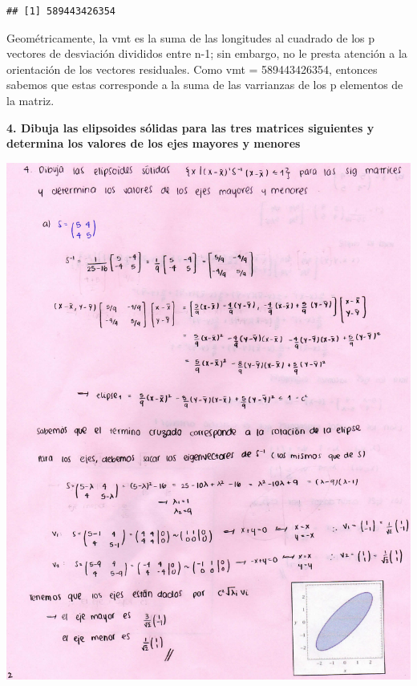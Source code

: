 \documentclass[
]{article}
\begin{document}
\begin{verbatim}
## [1] 589443426354
\end{verbatim}

Geométricamente, la vmt es la suma de las longitudes al cuadrado de los
p vectores de desviación divididos entre n-1; sin embargo, no le presta
atención a la orientación de los vectores residuales. Como vmt =
589443426354, entonces sabemos que estas corresponde a la suma de las
varrianzas de los p elementos de la matriz.

\textbf{4. Dibuja las elipsoides sólidas para las tres matrices
siguientes y determina los valores de los ejes mayores y menores}

\includegraphics{4a.jpg}
\end{document}
